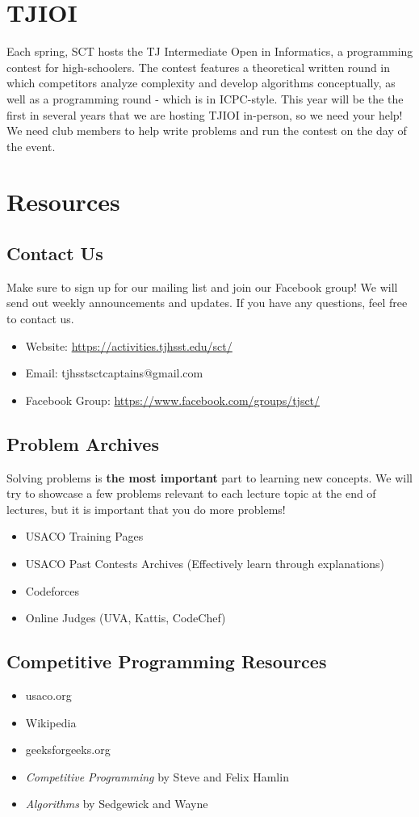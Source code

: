 \documentclass[11pt]{article}
\begin{document}
\section{TJIOI}
    Each spring, SCT hosts the TJ Intermediate Open in Informatics, a programming contest for high-schoolers. The contest features a theoretical written round in which competitors analyze complexity and develop algorithms conceptually, as well as a programming round - which is in  ICPC-style. This year will be the the first in several years that we are hosting TJIOI in-person, so we need your help! We need club members to help write problems and run the contest on the day of the event.

\section{Resources}
\subsection{Contact Us}
    Make sure to sign up for our mailing list and join our Facebook group! We will send out weekly announcements and updates. If you have any questions, feel free to contact us.
\begin{itemize}
  \item Website: \url{https://activities.tjhsst.edu/sct/}
  \item Email: tjhsstsctcaptains@gmail.com
  \item Facebook Group: \url{https://www.facebook.com/groups/tjsct/}
\end{itemize}

\subsection{Problem Archives}
    Solving problems is \textbf{the most important} part to learning new concepts. We will try to showcase a few problems relevant to each lecture topic at the end of lectures, but it is important that you do more problems!
\begin{itemize}
  \item USACO Training Pages
  \item USACO Past Contests Archives (Effectively learn through explanations)
  \item Codeforces
  \item Online Judges (UVA, Kattis, CodeChef)
\end{itemize}

\subsection{Competitive Programming Resources}
\begin{itemize}
  \item usaco.org
  \item Wikipedia
  \item geeksforgeeks.org
  \item \textit{Competitive Programming} by Steve and Felix Hamlin 
  \item \textit{Algorithms} by Sedgewick and Wayne
\end{itemize}
\end{document}
